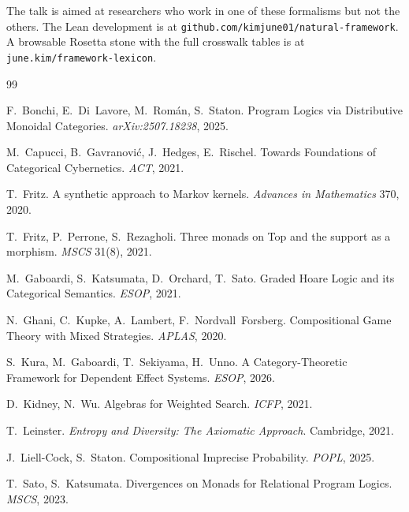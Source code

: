 \documentclass[11pt,a4paper]{article}
\begin{document}
\medskip\noindent
The talk is aimed at researchers who work in one of these formalisms but not the others. The Lean development is at \texttt{github.com/kimjune01/natural-framework}. A browsable Rosetta stone with the full crosswalk tables is at \texttt{june.kim/framework-lexicon}.

\begin{thebibliography}{99}
\small

F.~Bonchi, E.~Di~Lavore, M.~Rom\'an, S.~Staton.
Program Logics via Distributive Monoidal Categories.
\textit{arXiv:2507.18238}, 2025.

M.~Capucci, B.~Gavranovi\'c, J.~Hedges, E.~Rischel.
Towards Foundations of Categorical Cybernetics.
\textit{ACT}, 2021.

T.~Fritz.
A synthetic approach to Markov kernels.
\textit{Advances in Mathematics} 370, 2020.

T.~Fritz, P.~Perrone, S.~Rezagholi.
Three monads on Top and the support as a morphism.
\textit{MSCS} 31(8), 2021.

M.~Gaboardi, S.~Katsumata, D.~Orchard, T.~Sato.
Graded Hoare Logic and its Categorical Semantics.
\textit{ESOP}, 2021.

N.~Ghani, C.~Kupke, A.~Lambert, F.~Nordvall~Forsberg.
Compositional Game Theory with Mixed Strategies.
\textit{APLAS}, 2020.

S.~Kura, M.~Gaboardi, T.~Sekiyama, H.~Unno.
A Category-Theoretic Framework for Dependent Effect Systems.
\textit{ESOP}, 2026.

D.~Kidney, N.~Wu.
Algebras for Weighted Search.
\textit{ICFP}, 2021.

T.~Leinster.
\textit{Entropy and Diversity: The Axiomatic Approach}.
Cambridge, 2021.

J.~Liell-Cock, S.~Staton.
Compositional Imprecise Probability.
\textit{POPL}, 2025.

T.~Sato, S.~Katsumata.
Divergences on Monads for Relational Program Logics.
\textit{MSCS}, 2023.

\end{thebibliography}
\end{document}
